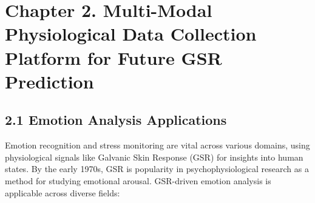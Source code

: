 \documentclass[11pt,a4paper]{report}
\begin{document}
\label{chap:2}

\chapter{Chapter 2. Multi-Modal Physiological Data Collection Platform for Future GSR Prediction}

\section{2.1 Emotion Analysis Applications}

Emotion recognition and stress monitoring are vital across various
domains, using physiological signals like Galvanic Skin Response
(GSR) for insights into human states.  By the early 1970s, GSR is popularity in
psychophysiological research as a method for studying emotional
arousal\cite{Boucsein2012}.
GSR-driven emotion analysis is applicable across diverse
fields:
\end{document}
